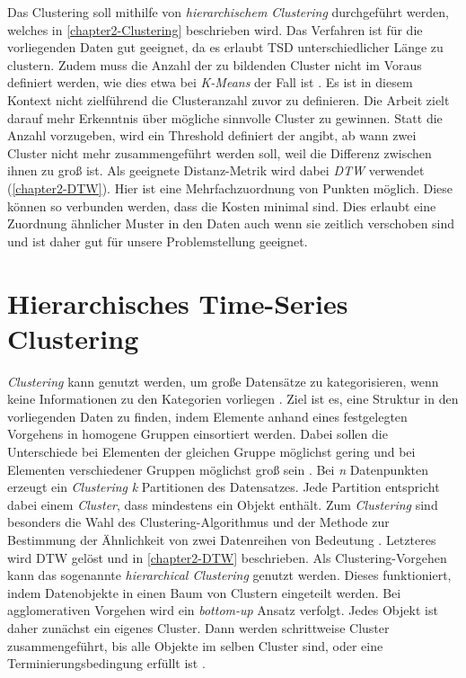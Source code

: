 Das Clustering soll mithilfe von \emph{hierarchischem Clustering} durchgeführt werden,
welches in \autoref{chapter2-Clustering} beschrieben wird.
Das Verfahren ist für die vorliegenden Daten gut geeignet,
da es erlaubt \ac{TSD} unterschiedlicher Länge zu clustern.
Zudem muss die Anzahl der zu bildenden Cluster nicht im Voraus definiert werden,
wie dies etwa bei \emph{K-Means} der Fall ist \citep{aghabozorgi_time-series_2015}.
Es ist in diesem Kontext nicht zielführend die Clusteranzahl zuvor zu definieren.
Die Arbeit zielt darauf mehr Erkenntnis über mögliche sinnvolle Cluster zu gewinnen.
Statt die Anzahl vorzugeben, wird ein Threshold definiert der angibt,
ab wann zwei Cluster nicht mehr zusammengeführt werden soll,
weil die Differenz zwischen ihnen zu groß ist.
Als geeignete Distanz-Metrik wird dabei \emph{\ac{DTW}} verwendet (\autoref{chapter2-DTW}).
Hier ist eine Mehrfachzuordnung von Punkten möglich.
Diese können so verbunden werden, dass die Kosten minimal sind.
Dies erlaubt eine Zuordnung ähnlicher Muster in den Daten auch wenn sie zeitlich verschoben sind
und ist daher gut für unsere Problemstellung geeignet.

\section{Hierarchisches Time-Series Clustering}
\label{chapter2-Clustering}
\emph{Clustering} kann genutzt werden, um große Datensätze zu kategorisieren,
wenn keine Informationen zu den Kategorien vorliegen \citep{aghabozorgi_time-series_2015}.
Ziel ist es, eine Struktur in den vorliegenden Daten zu finden,
indem Elemente anhand eines festgelegten Vorgehens in homogene Gruppen einsortiert werden.
Dabei sollen die Unterschiede bei Elementen der gleichen Gruppe möglichst gering
und bei Elementen verschiedener Gruppen möglichst groß sein \citep{aghabozorgi_time-series_2015, warren_liao_clustering_2005}.
Bei \emph{n} Datenpunkten erzeugt ein \emph{Clustering} \emph{k} Partitionen des Datensatzes.
Jede Partition entspricht dabei einem \emph{Cluster}, dass mindestens ein Objekt enthält.
Zum \emph{Clustering} sind besonders die Wahl des Clustering-Algorithmus
und der Methode zur Bestimmung der Ähnlichkeit von zwei Datenreihen von Bedeutung \citep{warren_liao_clustering_2005}.
Letzteres wird \ac{DTW} gelöst und in \autoref{chapter2-DTW} beschrieben.
Als Clustering-Vorgehen kann das sogenannte \emph{hierarchical Clustering} genutzt werden.
Dieses funktioniert, indem Datenobjekte in einen Baum von Clustern eingeteilt werden.
Bei agglomerativen Vorgehen wird ein \emph{bottom-up} Ansatz verfolgt.
Jedes Objekt ist daher zunächst ein eigenes Cluster.
Dann werden schrittweise Cluster zusammengeführt,
bis alle Objekte im selben Cluster sind, oder eine Terminierungsbedingung erfüllt ist \citep{warren_liao_clustering_2005}.

